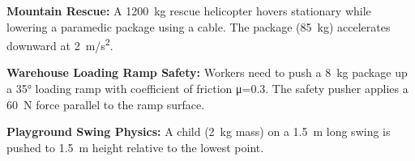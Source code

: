 \documentclass[addpoints]{exam}
\begin{document}
\begin{questions}
\begin{solution}[8cm]
    
\end{solution}


\question \textbf{Mountain Rescue:} A \SI{1200}{kg} rescue helicopter hovers stationary while lowering a paramedic package using a cable. The package (\SI{85}{kg}) accelerates downward at \SI{2}{m/s^2}.
\begin{solution}[8cm]
    
\end{solution}

\question \textbf{Warehouse Loading Ramp Safety:} Workers need to push a \SI{8}{kg} package up a \ang{35} loading ramp with coefficient of friction μ=0.3. The safety pusher applies a \SI{60}{N} force parallel to the ramp surface.
\begin{solution}[8cm][8cm]
    
\end{solution}

\question \textbf{Playground Swing Physics:} A child (\SI{2}{kg} mass) on a \SI{1.5}{m} long swing is pushed to \SI{1.5}{m} height relative to the lowest point.
\begin{parts}

\end{parts}
\end{questions}
\end{document}
